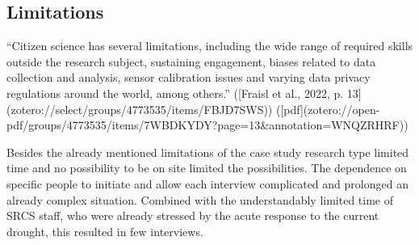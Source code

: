 \subsection{Limitations}
“Citizen science has several limitations, including the wide range of required skills outside the research subject, sustaining engagement, biases related to data collection and analysis, sensor calibration issues and varying data privacy regulations around the world, among others.” ([Fraisl et al., 2022, p. 13](zotero://select/groups/4773535/items/FBJD7SWS)) ([pdf](zotero://open-pdf/groups/4773535/items/7WBDKYDY?page=13&annotation=WNQZRHRF))




Besides the already mentioned limitations of the case study research type limited time and no possibility to be on site limited the possibilities. The dependence on specific people to initiate and allow each interview complicated and prolonged an already complex situation. Combined with the understandably limited time of SRCS staff, who were already stressed by the acute response to the current drought, this resulted in few interviews.